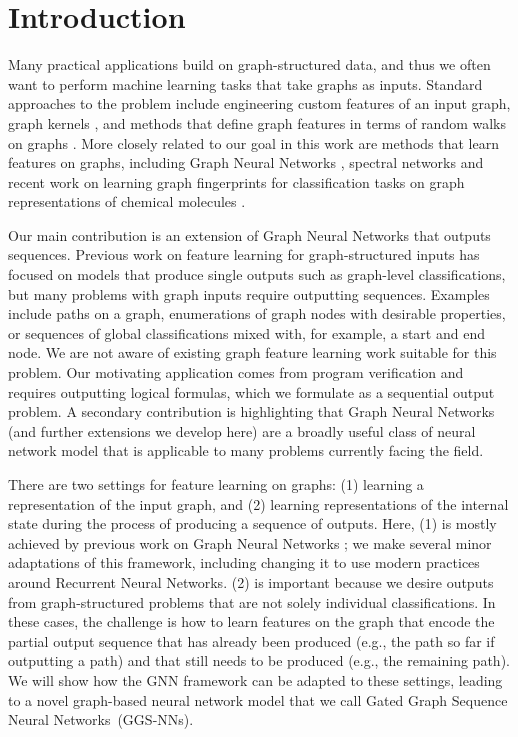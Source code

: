 \documentclass{article} \usepackage{iclr2016_conference,times}
\newcommand{\OurMethod}{Gated Graph Sequence Neural Network}
\newcommand{\OurMethods}{\OurMethod s}
\newcommand{\OurMethodShort}{GGS-NN}
\newcommand{\OurMethodShorts}{\OurMethodShort s}
\begin{document}
\section{Introduction}

Many practical applications build on graph-structured data, and thus we often
want to perform machine learning tasks that take graphs as inputs. Standard approaches
to the problem include engineering custom features of an input graph,
graph kernels
\citep{kashima2003marginalized,shervashidze2011weisfeiler}, and
methods that define graph features in terms of random walks on graphs
\citep{perozzi2014deepwalk}.  More closely related to our goal in this
work are methods that learn features on graphs, including Graph Neural
Networks \citep{gori2005new,scarselli2009graph}, spectral networks
\citep{bruna2013spectral} and recent work on learning graph
fingerprints for classification tasks on graph representations of
chemical molecules \citep{duvenaud2015convolutional}.



Our main contribution is an extension of Graph Neural Networks that outputs
sequences. Previous work
on feature learning for graph-structured inputs has focused on models
that produce single outputs such as graph-level classifications, but
many problems with graph inputs require outputting sequences.
Examples include paths on a graph, enumerations of graph nodes with
desirable properties, or sequences of global classifications mixed
with, for example, a start and end node.  We are not aware of existing
graph feature learning work suitable for this problem. Our motivating
application comes from program verification and requires outputting
logical formulas, which we formulate as a sequential output problem.
A secondary contribution is highlighting that
Graph Neural Networks (and further extensions we develop here) are a
broadly useful class of neural network model that is applicable to many problems
currently facing the field.


There are two settings for feature learning on graphs: (1) learning a
representation of the input graph, and (2) learning representations of
the internal state during the process of producing a sequence of outputs.
Here, (1) is mostly achieved by previous work on Graph Neural Networks
\citep{scarselli2009graph}; we make several minor adaptations of
this framework, including changing it to use modern practices around
Recurrent Neural Networks. (2) is important because we desire outputs
from graph-structured problems that are not solely individual
classifications.  In these cases, the challenge is how to learn
features on the graph that encode the partial output sequence that has
already been produced (e.g., the path so far if outputting a path) and
that still needs to be produced (e.g., the remaining path). We will
show how the GNN framework can be adapted to these settings, leading
to a novel graph-based neural network model that we call
\OurMethods~(\OurMethodShorts).
\end{document}
